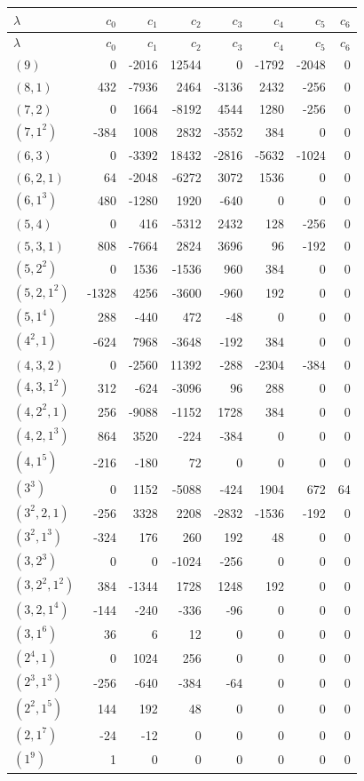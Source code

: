 \documentclass[11pt]{article}
\numberwithin{equation}{section}
\begin{document}
{\small\setlength{\tabcolsep}{6pt}
\begin{longtable}{@{}lrrrrrrr@{}}
\toprule
$\lambda$&$c_0$&$c_1$&$c_2$&$c_3$&$c_4$&$c_5$&$c_6$\\\midrule
\endfirsthead
\toprule
$\lambda$&$c_0$&$c_1$&$c_2$&$c_3$&$c_4$&$c_5$&$c_6$\\\midrule
\endhead
$(9)$ & 0 & -2016 & 12544 & 0 & -1792 & -2048 & 0 \\
$(8,1)$ & 432 & -7936 & 2464 & -3136 & 2432 & -256 & 0 \\
$(7,2)$ & 0 & 1664 & -8192 & 4544 & 1280 & -256 & 0 \\
$(7,1^{2})$ & -384 & 1008 & 2832 & -3552 & 384 & 0 & 0 \\
$(6,3)$ & 0 & -3392 & 18432 & -2816 & -5632 & -1024 & 0 \\
$(6,2,1)$ & 64 & -2048 & -6272 & 3072 & 1536 & 0 & 0 \\
$(6,1^{3})$ & 480 & -1280 & 1920 & -640 & 0 & 0 & 0 \\
$(5,4)$ & 0 & 416 & -5312 & 2432 & 128 & -256 & 0 \\
$(5,3,1)$ & 808 & -7664 & 2824 & 3696 & 96 & -192 & 0 \\
$(5,2^{2})$ & 0 & 1536 & -1536 & 960 & 384 & 0 & 0 \\
$(5,2,1^{2})$ & -1328 & 4256 & -3600 & -960 & 192 & 0 & 0 \\
$(5,1^{4})$ & 288 & -440 & 472 & -48 & 0 & 0 & 0 \\
$(4^{2},1)$ & -624 & 7968 & -3648 & -192 & 384 & 0 & 0 \\
$(4,3,2)$ & 0 & -2560 & 11392 & -288 & -2304 & -384 & 0 \\
$(4,3,1^{2})$ & 312 & -624 & -3096 & 96 & 288 & 0 & 0 \\
$(4,2^{2},1)$ & 256 & -9088 & -1152 & 1728 & 384 & 0 & 0 \\
$(4,2,1^{3})$ & 864 & 3520 & -224 & -384 & 0 & 0 & 0 \\
$(4,1^{5})$ & -216 & -180 & 72 & 0 & 0 & 0 & 0 \\
$(3^{3})$ & 0 & 1152 & -5088 & -424 & 1904 & 672 & 64 \\
$(3^{2},2,1)$ & -256 & 3328 & 2208 & -2832 & -1536 & -192 & 0 \\
$(3^{2},1^{3})$ & -324 & 176 & 260 & 192 & 48 & 0 & 0 \\
$(3,2^{3})$ & 0 & 0 & -1024 & -256 & 0 & 0 & 0 \\
$(3,2^{2},1^{2})$ & 384 & -1344 & 1728 & 1248 & 192 & 0 & 0 \\
$(3,2,1^{4})$ & -144 & -240 & -336 & -96 & 0 & 0 & 0 \\
$(3,1^{6})$ & 36 & 6 & 12 & 0 & 0 & 0 & 0 \\
$(2^{4},1)$ & 0 & 1024 & 256 & 0 & 0 & 0 & 0 \\
$(2^{3},1^{3})$ & -256 & -640 & -384 & -64 & 0 & 0 & 0 \\
$(2^{2},1^{5})$ & 144 & 192 & 48 & 0 & 0 & 0 & 0 \\
$(2,1^{7})$ & -24 & -12 & 0 & 0 & 0 & 0 & 0 \\
$(1^{9})$ & 1 & 0 & 0 & 0 & 0 & 0 & 0 \\
\bottomrule
\end{longtable}}
\end{document}
